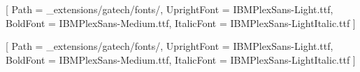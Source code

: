 
\usepackage{ifthen}
\usepackage{fancyhdr}    %
\usepackage{xcolor}       %
\usepackage{graphicx}     %
\usepackage{geometry}     %
\usepackage{eso-pic}      %
\usepackage{sectsty}      %
\usepackage{fontspec}     %
\usepackage{titlesec}     %
\usepackage{tocloft}  %

\setmainfont{fonts}[
  Path = _extensions/gatech/fonts/,
  UprightFont = IBMPlexSans-Light.ttf,
  BoldFont = IBMPlexSans-Medium.ttf,
  ItalicFont = IBMPlexSans-LightItalic.ttf
]

\setsansfont{fonts}[
  Path = _extensions/gatech/fonts/,
  UprightFont = IBMPlexSans-Light.ttf,
  BoldFont = IBMPlexSans-Medium.ttf,
  ItalicFont = IBMPlexSans-LightItalic.ttf
]



\geometry{letterpaper, top=25.4mm, bottom=25.4mm, left=25.4mm, right=32mm}



